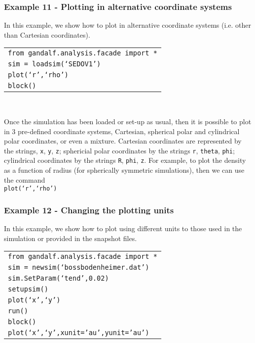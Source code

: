 \documentclass[a4paper]{article}
\newcommand{\var}[1]{\texttt{#1}}
\newcommand{\singlecommand}[1]{\\ \newline \indent \var{#1} \\ \newline \noindent}
\begin{document}
\subsubsection{Example  11 - Plotting in alternative coordinate systems}
In this example, we show how to plot in alternative coordinate systems (i.e. other than Cartesian coordinates). \\

\begin{tabular}{p{14.0cm}}
\var{from gandalf.analysis.facade import *} \\
\var{sim = loadsim(`SEDOV1')} \\
\var{plot(`r',`rho')} \\
\var{block()} \\
\end{tabular} \\
\newline

\noindent Once the simulation has been loaded or set-up as usual, then it is possible to plot in 3 pre-defined coordinate systems, Cartesian, spherical polar and cylindrical polar coordinates, or even a mixture.  Cartesian coordinates are represented by the strings, \var{x}, \var{y}, \var{z}; sphericial polar coordinates by the strings \var{r}, \var{theta}, \var{phi}; cylindrical coordinates by the strings \var{R}, \var{phi}, \var{z}.  For example, to plot the density as a function of radius (for spherically symmetric simulations), then we can use the command \singlecommand{plot(`r',`rho')}



\subsubsection{Example  12 - Changing the plotting units}
In this example, we show how to plot using different units to those used in the simulation or provided in the snapshot files. \\

\begin{tabular}{p{14.0cm}}
\var{from gandalf.analysis.facade import *} \\
\var{sim = newsim(`bossbodenheimer.dat')} \\
\var{sim.SetParam(`tend',0.02)} \\
\var{setupsim()} \\
\var{plot(`x',`y')} \\
\var{run()} \\
\var{block()} \\
\var{plot(`x',`y',xunit='au',yunit='au')} \\
\end{tabular} \\
\newline
\end{document}
